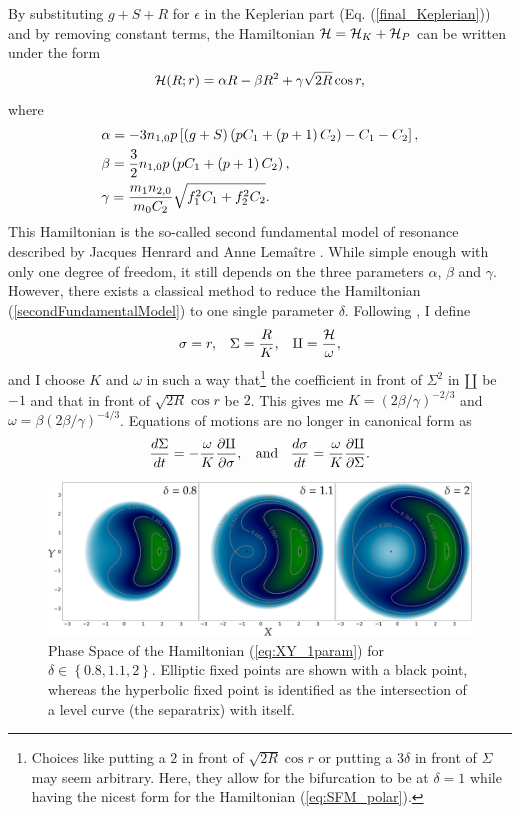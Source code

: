 \documentclass[12pt,a4paper,oneside]{article}
\begin{document}
By substituting $g+S+R$ for $\epsilon$ in the Keplerian part (Eq. (\ref{final_Keplerian})) and by removing constant terms, the Hamiltonian $\mathcal{H}=\mathcal{H}_K+\mathcal{H}_P$ can be written under the form
\begin{equation}\label{secondFundamentalModel}
	\mathcal{H}(R;r)=\alpha R-\beta R^2+\gamma\sqrt{2R}\cos r,
\end{equation}
where
\begin{equation}
	\begin{split}
		&\alpha=-3n_{1,0}p\left[\left(g+S\right)\left(pC_1+\left(p+1\right) C_2\right)-C_1-C_2\right],\\
		&\beta=\frac{3}{2}n_{1,0}p\left(pC_1+\left(p+1\right) C_2\right),\\
		&\gamma=\frac{m_1n_{2,0}}{m_0C_2}\sqrt{f_1^2C_1+f_2^2C_2}.
	\end{split}
\end{equation}
This Hamiltonian is the so-called second fundamental model of resonance described by Jacques Henrard and Anne Lemaître \citep{Henrard1983}. While simple enough with only one degree of freedom, it still depends on the three parameters $\alpha$, $\beta$ and $\gamma$. However, there exists a classical method to reduce the Hamiltonian (\ref{secondFundamentalModel}) to one single parameter $\delta$. Following \cite{Henrard1983}, I define
\begin{equation}
	\sigma=r,\;\;\;\Sigma=\frac{R}{K},\;\;\;\amalg=\frac{\mathcal{H}}{\omega},
\end{equation}
and I choose $K$ and $\omega$ in such a way that\footnote{Choices like putting a $2$ in front of $\sqrt{2R}\cos r$ or putting a $3\delta$ in front of $\Sigma$ may seem arbitrary. Here, they allow for the bifurcation to be at $\delta=1$ while having the nicest form for the Hamiltonian (\ref{eq:SFM_polar}).} the coefficient in front of $\Sigma^2$ in $\amalg$ be $-1$ and that in front of $\sqrt{2R}\cos r$ be $2$. This gives me $K=\left(2\beta/\gamma\right)^{-2/3}$ and $\omega=\beta\left(2\beta/\gamma\right)^{-4/3}$. Equations of motions are no longer in canonical form as
\begin{equation}
	\frac{d\Sigma}{dt}=-\frac{\omega}{K}\frac{\partial \amalg}{\partial \sigma},\;\;\text{ and }\;\;\frac{d\sigma}{dt}=\frac{\omega}{K}\frac{\partial \amalg}{\partial \Sigma}.
\end{equation}
\begin{figure}[h]
	\centering
	\includegraphics[width=\linewidth]{../img/PhaseSpaceSFM.png}
	\caption{Phase Space of the Hamiltonian (\ref{eq:XY_1param}) for $\delta\in\left\lbrace0.8,1.1,2\right\rbrace$. Elliptic fixed points are shown with a black point, whereas the hyperbolic fixed point is identified as the intersection of a level curve (the separatrix) with itself.}\label{fig:PhaseSpaceSFM}
\end{figure}
\end{document}
